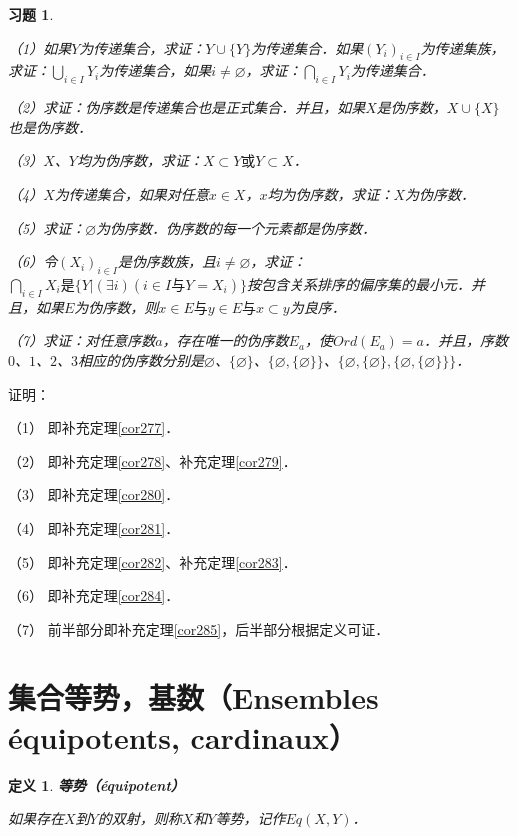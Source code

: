 \documentclass[12pt, a4paper, oneside]{book}
\newtheorem{de}{定义}
\newtheorem{exer}{习题}
\begin{document}
			\begin{exer}\label{exer120}
				\hfill\par
				（1）如果$Y$为传递集合，求证：$Y\cup\{Y\}$为传递集合．如果$(Y_i)_{i\in I}$为传递集族，求证：$\bigcup\limits_{i\in I}Y_i$为传递集合，如果$i\neq \varnothing$，求证：$\bigcap\limits_{i\in I}Y_i$为传递集合．
				\par
				（2）求证：伪序数是传递集合也是正式集合．并且，如果$X$是伪序数，$X\cup\{X\}$也是伪序数．
				\par
				（3）$X$、$Y$均为伪序数，求证：$X\subset Y\text{或}Y\subset X$．
				\par
				（4）$X$为传递集合，如果对任意$x\in X$，$x$均为伪序数，求证：$X$为伪序数．
				\par
				（5）求证：$\varnothing$为伪序数．伪序数的每一个元素都是伪序数．
				\par
				（6）令$(X_i)_{i\in I}$是伪序数族，且$i\neq \varnothing$，求证：$\bigcap\limits_{i\in I}X_i是\{Y|(\exists i)(i\in I\text{与}Y=X_i)\}$按包含关系排序的偏序集的最小元．并且，如果$E$为伪序数，则$x\in E\text{与}y\in E\text{与}x\subset y$为良序．
				\par
				（7）求证：对任意序数$a$，存在唯一的伪序数$E_a$，使$Ord(E_a)=a$．并且，序数$0$、$1$、$2$、$3$相应的伪序数分别是$\varnothing$、$\{\varnothing\}$、$\{\varnothing, \{\varnothing\}\}$、$\{\varnothing, \{\varnothing\}, \{\varnothing, \{\varnothing\}\}\}$．
			\end{exer}
			证明：
			\par
			（1）	即补充定理\ref{cor277}．
			\par
			（2）	即补充定理\ref{cor278}、补充定理\ref{cor279}．
			\par
			（3）	即补充定理\ref{cor280}．
			\par
			（4）	即补充定理\ref{cor281}．
			\par
			（5）	即补充定理\ref{cor282}、补充定理\ref{cor283}．
			\par
			（6）	即补充定理\ref{cor284}．
			\par
			（7）	前半部分即补充定理\ref{cor285}，后半部分根据定义可证．

		\section{集合等势，基数（Ensembles équipotents, cardinaux）}		
			\begin{de}
				\textbf{等势（équipotent）}
				\par
				如果存在$X$到$Y$的双射，则称$X$和$Y$等势，记作$Eq(X, Y)$．
			\end{de}
			
\end{document}
